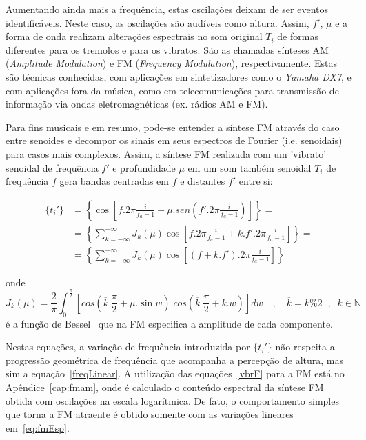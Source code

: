 Aumentando ainda mais a frequência, estas oscilações
deixam de ser eventos identificáveis. 
Neste caso, as oscilações são
audíveis como altura. Assim, $f'$, $\mu$ e a forma de onda realizam alterações espectrais no som
original $T_i$ de formas diferentes para os tremolos e para os vibratos. São as 
chamadas sínteses AM (\emph{Amplitude Modulation}) e FM (\emph{Frequency Modulation}), respectivamente.
Estas são técnicas conhecidas, com aplicações em sintetizadores
como o \emph{Yamaha DX7}, e com aplicações fora da música, como em telecomunicações para transmissão de informação via ondas eletromagnéticas (ex. rádios AM e FM).

Para fins musicais e em resumo, pode-se entender a síntese FM através do caso entre senoides
e decompor os sinais em seus espectros de Fourier (i.e. senoidais) para casos mais complexos.
Assim, a síntese FM realizada com um 'vibrato' senoidal de frequência $f'$ e profundidade $\mu$ em um som também senoidal $T_i$ de frequência $f$
gera bandas centradas em $f$ e distantes $f'$ entre si:

\begin{equation}\label{eq:fmEsp}
\begin{split}
\{t_i'\} & = \left \{ \cos \left [f . 2 \pi \frac{i}{f_a-1} + \mu . sen \left ( f' . 2 \pi \frac{i}{ f_a -1 } \right ) \right ] \right \} = \\
 & = \left \{ \sum_{k=-\infty}^{+\infty} J_k(\mu) \cos \left [ f . 2 \pi \frac{i}{f_a-1} + k . f' . 2 \pi \frac{i}{f_a-1} \right ]  \right \} = \\
 & = \left \{ \sum_{k=-\infty}^{+\infty} J_k(\mu) \cos \left [ (f+k.f') . 2 \pi \frac{i}{f_a-1} \right ]  \right \}
\end{split}
\end{equation}

onde 
\begin{equation}
J_k(\mu) = \frac{2}{\pi} \int_0^{\frac{\pi}{2}}\left [ cos \left (\overline{k}\;\frac{\pi}{2} + \mu . \sin w \right ) . cos \left ( \overline{k}\;\frac{\pi}{2} + k . w \right ) \right ] dw \quad , \quad \overline{k} = k \% 2 \;\;,\;\; k \in \mathbb{N}
\end{equation}
é a função de Bessel~\cite{BesselCCRMA,JOSFM} que na FM especifica a amplitude de cada componente. 

Nestas equações, a variação de frequência introduzida por $\{t_i'\}$ não respeita a progressão geométrica de frequência que acompanha a percepção de altura, mas sim a equação~\ref{freqLinear}. A utilização das equações~\ref{vbrF} para a FM está no Apêndice~\ref{cap:fmam}, onde é calculado o conteúdo espectral da síntese FM obtida com oscilações na escala logarítmica. De fato, o comportamento simples que torna a FM atraente é obtido somente com as variações lineares em~\ref{eq:fmEsp}.


